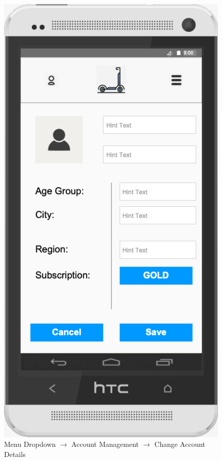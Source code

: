\documentclass[a4paper, 12pt]{article}
\begin{document}
\begin{figure} [htbp]
  \begin{center}
    \includegraphics[scale=0.6]{03-01-01-menu-dropdown--account-management--change-account-details.png}
  \end{center}
  \caption{Menu Dropdown $\rightarrow$ Account Management $\rightarrow$ Change Account Details}
\end{figure}
\end{document}
